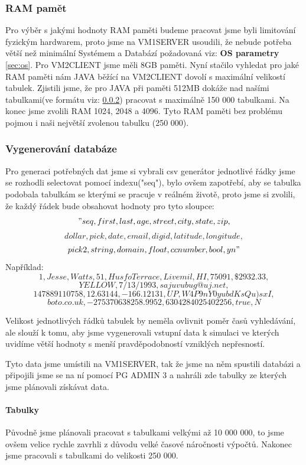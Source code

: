 \documentclass[a4paper, 11pt]{article}
\begin{document}
\subsubsection{RAM pamět}
Pro výběr s jakými hodnoty RAM paměti budeme pracovat jsme byli limitování fyzickým hardwarem, proto jsme na VM1SERVER usoudili, že nebude potřeba větší než minimální Systémem a Databází požadovaná viz: \textbf{OS parametry} \ref{sec:os}. Pro VM2CLIENT jsme měli 8GB paměti. Nyní stačilo vyhledat pro jaké RAM paměti nám JAVA běžící na VM2CLIENT dovolí s maximální velikostí tabulek. Zjistili jsme, že pro JAVA při paměti 512MB dokáže nad našími tabulkami(ve formátu viz: \ref{sec:table}) pracovat s maximálně 150 000 tabulkami. Na konec jsme zvolili RAM 1024, 2048 a 4096. Tyto RAM paměti bez problému pojmou i naši největší zvolenou tabulku (250 000).

\subsubsection{Vygenerování databáze} \label{sec:table}

Pro generaci potřebných dat jsme si vybrali csv generátor \cite{csvgenerator} jednotlivé řádky jsme se rozhodli selectovat pomocí indexu("seq"), bylo ovšem zapotřebí, aby se tabulka podobala tabulkám se kterými se pracuje v reálném životě, proto jsme si zvolili, že každý řádek bude obsahovat hodnoty pro tyto sloupce:
$$"seq, first, last, age, street, city, state, zip, $$
$$dollar, pick, date, email, digid, latitude, longitude, $$
$$pick2, string, domain, float, ccnumber, bool, yn"$$
Například:
$$1,Jesse,Watts,51,Husfo Terrace,Livemil,HI,75091,\$2932.33,$$
$$YELLOW,7/13/1993,sajuvubug@uj.net,$$
$$147889110758,12.63144,-166.12131,UP,W4P9nY0yubdKsQu)sxI,$$
$$boto.co.uk,-275370638258.9952,6304284025402256,true,N$$


Velikost jednotlivých řádků tabulek by neměla ovlivnit poměr časů vyhledávání, ale slouží k tomu, aby jsme vygenerovali vstupní data k simulaci ve kterých uvidíme větší hodnoty s menší pravděpodobností vzniklých nepřesností.

Tyto data jsme umístili na VM1SERVER, tak že jsme na něm spustili databázi a připojili jsme se na ní pomocí PG ADMIN 3 \cite{pgadmin} a nahráli zde tabulky ze kterých jsme plánovali získávat data.
\paragraph{Tabulky}
Původně jsme plánovali pracovat s tabulkami velkými až 10 000 000, to jsme ovšem velice rychle zavrhli z důvodu velké časové náročnosti výpočtů. Nakonec jsme pracovali s tabulkami do velikosti 250 000.
\end{document}
